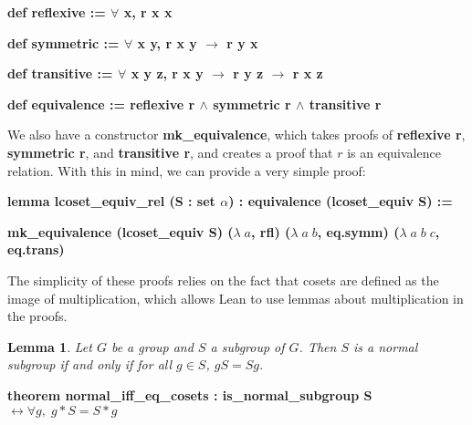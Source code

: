 \documentclass[runningheads,a4paper]{llncs}
\renewcommand{\a}{\alpha}
\renewcommand{\l}{\lambda}
\renewcommand{\-}{\setminus}
\newtheorem{lemma}[theorem]{Lemma}
\begin{document}
\vspace{2 mm}
\hspace{2 em}\textbf{def reflexive := $\forall$ x, r x x}

\hspace{2 em}\textbf{def symmetric := $\forall$ {x y}, r x y $\to$ r y x}

\hspace{2 em}\textbf{def transitive := $\forall$ {x y z}, r x y $\to$ r y z $\to$ r x z}

\hspace{2 em}\textbf{def equivalence := reflexive r $\land$ symmetric r $\land$ transitive r}
\vspace{2 mm}

We also have a constructor \textbf{mk\_equivalence}, which takes proofs of \textbf{reflexive r}, \textbf{symmetric r}, and \textbf{transitive r}, and creates a proof that $r$ is an equivalence relation. With this in mind, we can provide a very simple proof:

\vspace{2 mm}
\hspace{2 em}\textbf{lemma lcoset\_equiv\_rel (S : set $\a$) : equivalence (lcoset\_equiv S) :=}

\hspace{4 em}\textbf{mk\_equivalence (lcoset\_equiv S) ($\l\; a$, rfl) ($\l\;a\;b$, eq.symm) ($\l\;a\;b\;c$, eq.trans)}
\vspace{2 mm}

The simplicity of these proofs relies on the fact that cosets are defined as the image of multiplication, which allows Lean to use lemmas about multiplication in the proofs.

\begin{lemma}
Let $G$ be a group and $S$ a subgroup of $G$. Then $S$ is a normal subgroup if and only if for all $g \in S$, $gS = Sg$.
\end{lemma}

\vspace{2 mm}
\hspace{2 em}\textbf{theorem normal\_iff\_eq\_cosets : is\_normal\_subgroup S $\leftrightarrow \forall g,\; g * S = S * g$}
\vspace{2 mm}

\end{document}
